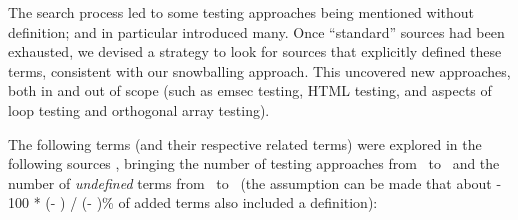 The search process led to some testing approaches being
mentioned without definition;
\citep{IEEE2022} and \citep{Firesmith2015} in particular introduced many.
Once ``standard'' sources had been exhausted, we devised a strategy to
look for sources that explicitly defined these terms, consistent with
our snowballing approach. This uncovered new approaches, both in and out of
scope (such as \acf{emsec} testing, HTML testing, and aspects of loop testing and
orthogonal array testing).

The following terms (and their respective related terms)
were explored%
\ifnotpaper
      { in the following sources}%
\fi, bringing the number of testing
approaches from \the\TotalBefore~to \the\TotalAfter~and the number of
\emph{undefined} terms from \the\UndefBefore~to \the\UndefAfter~(the assumption
can be made that about \the{} - 100 * (\UndefAfter - \UndefBefore) /
(\TotalAfter - \TotalBefore)\relax\% of added terms also included a definition):


